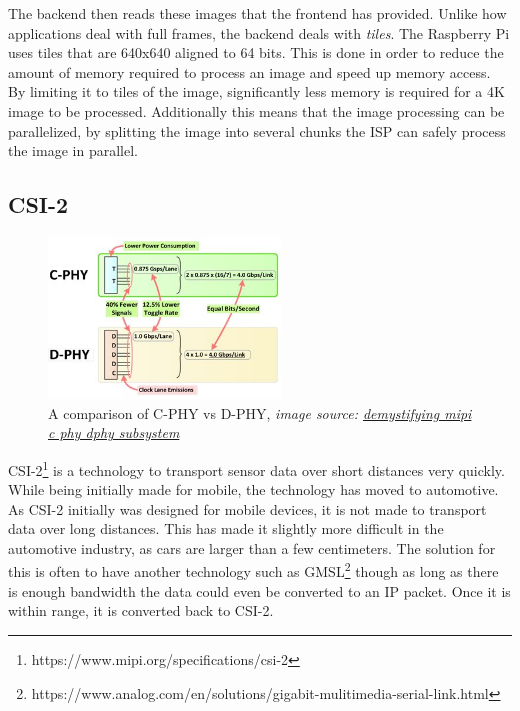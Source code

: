 The backend then reads these images that the frontend has provided. Unlike how
applications deal with full frames, the backend deals with \textit{tiles}. The
Raspberry Pi uses tiles that are 640x640 aligned to 64 bits. This is done in
order to reduce the amount of memory required to process an image and speed up
memory access. By limiting it to tiles of the image, significantly less memory
is required for a 4K image to be processed. Additionally this means that the
image processing can be parallelized, by splitting the image into several
chunks the ISP can safely process the image in parallel.


\subsection{CSI-2}
\begin{figure}
    \begin{center}
        \includegraphics[width=0.55\textwidth]{figures/cphydphy.jpg}
    \end{center}
    \caption{A comparison of C-PHY vs D-PHY, \textit{image source: \href{https://www.design-reuse.com/articles/43954/demystifying-mipi-c-phy-dphy-subsystem.html}{demystifying mipi c phy dphy subsystem}}}
    \label{fig:cphydphycomparison}
\end{figure}

CSI-2\footnote{https://www.mipi.org/specifications/csi-2} is a technology to
transport sensor data over short distances very quickly. While being initially
made for mobile, the technology has moved to automotive. As CSI-2 initially was designed for
mobile devices, it is not made to transport data over long distances. This has made it
slightly more difficult in the automotive industry, as cars are larger than a
few centimeters. The solution for this is often to have another technology such
as GMSL\footnote{https://www.analog.com/en/solutions/gigabit-mulitimedia-serial-link.html}
though as long as there is enough bandwidth the data could even be converted to
an IP packet. Once it is within range, it is converted back to CSI-2.

